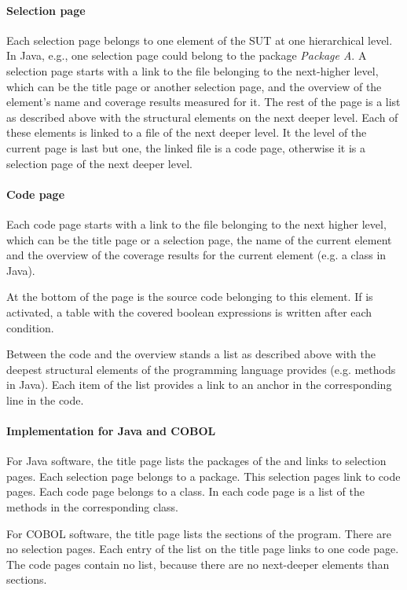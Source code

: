 \paragraph{Selection page}
Each selection page belongs to one element of the SUT at one hierarchical level. In Java, e.g., one selection page could belong to the package \textit{Package A}. A selection page starts with a link to the file belonging to the next-higher level, which can be the title page or another selection page, and the overview of the element's name and coverage results measured for it. The rest of the page is a list as described above with the structural elements on the next deeper level. Each of these elements is linked to a file of the next deeper level. It the level of the current page is last but one, the linked file is a code page, otherwise it is a selection page of the next deeper level.

\paragraph{Code page}
Each code page starts with a link to the file belonging to the next higher level, which can be the title page or a selection page, the name of the current element and the overview of the coverage results for the current element (e.g. a class in Java). 
\par
At the bottom of the page is the source code belonging to this element. If  is activated, a table with the covered boolean expressions is written after each condition.
\par
Between the code and the overview stands a list as described above with the deepest structural elements of the programming language provides (e.g. methods in Java). Each item of the list provides a link to an anchor in the corresponding line in the code.

\paragraph{Implementation for Java and COBOL}
For Java software, the title page lists the packages of the  and links to selection pages. Each selection page belongs to a package. This selection pages link to code pages. Each code page belongs to a class. In each code page is a list of the methods in the corresponding class.
\par
For COBOL software, the title page lists the sections of the program. There are no selection pages. Each entry of the list on the title page links to one code page. The code pages contain no list, because there are no next-deeper elements than sections.

